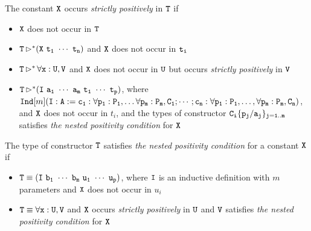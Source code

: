 \begin{Def}
The constant $\tt X$ occurs \textit{strictly positively} in $\tt T$ if
\begin{itemize}\normalfont
    \item $\tt X$ does not occur in $\tt T$
    \item $\tt T\mathop{\rhd}^*\tt (X\ t_1\ \cdots\ t_n)$ and $\tt X$ does not occur in $\tt t_i$
    \item $\tt T\mathop{\rhd}^*\tt \forall x:U,V$ and $\tt X$ does not occur in $\tt U$ but occurs
        \textit{strictly positively} in $\tt V$
    \item $\tt T\mathop{\rhd}^*\tt (I\ a_1\ \cdots\ a_m\ t_1\ \cdots\ t_p)$, where
        ${\tt Ind}[m](\tt I:A:=c_1:\forall p_1:P_1,\dots\forall p_m:P_m,C_1;\cdots;c_n:\forall p_1:P_1,\dots,
        \forall p_m:P_m,C_n)$, and $\tt X$ does not occur in $t_i$, and the types of constructor
        $\tt C_i\{p_j/a_j\}_{j=1..m}$ satisfies \textit{the nested positivity condition} for $\tt X$
\end{itemize}
\end{Def}

\begin{Def}
The type of constructor $\tt T$ satisfies \textit{the nested positivity condition} for a constant $\tt X$ if
\begin{itemize}\normalfont
    \item $\tt T\equiv(I\ b_1\ \cdots\ b_m\ u_1\ \cdots\ u_p)$, where $\tt I$ is an inductive definition with $m$
        parameters and $\tt X$ does not occur in $u_i$
    \item $\tt T\equiv\forall x:U,V$ and $\tt X$ occurs \textit{strictly positively} in $\tt U$ and $\tt V$
        satisfies \textit{the nested positivity condition} for $\tt X$
\end{itemize}
\end{Def}
